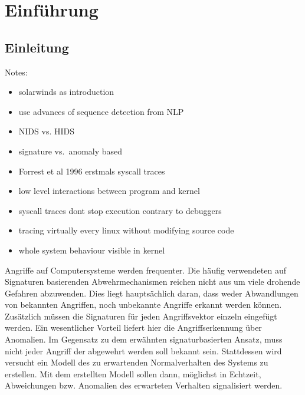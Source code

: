 \chapter{Einführung}\label{ch:introduction} %
\section{Einleitung}\label{sec:einleitung}
Notes:

\begin{itemize}
    \item solarwinds as introduction
    \item use advances of sequence detection from NLP
    \item NIDS vs. HIDS
    \item signature vs.\ anomaly based
    \item Forrest et al 1996 erstmals syscall traces
    \item low level interactions between program and kernel
    \item syscall traces dont stop execution contrary to debuggers
    \item tracing virtually every linux without modifying source code
    \item whole system behaviour visible in kernel
\end{itemize}

Angriffe auf Computersysteme werden frequenter.
Die häufig verwendeten auf Signaturen basierenden Abwehrmechanismen reichen nicht aus um viele drohende Gefahren abzuwenden.
Dies liegt hauptsächlich daran, dass weder Abwandlungen von bekannten Angriffen, noch unbekannte Angriffe erkannt werden können.
Zusätzlich müssen die Signaturen für jeden Angriffsvektor einzeln eingefügt werden.
Ein wesentlicher Vorteil liefert hier die Angriffserkennung über Anomalien.
Im Gegensatz zu dem erwähnten signaturbasierten Ansatz, muss nicht jeder Angriff der abgewehrt werden soll bekannt sein.
Stattdessen wird versucht ein Modell des zu erwartenden Normalverhalten des Systems zu erstellen.
Mit dem erstellten Modell sollen dann, möglichst in Echtzeit, Abweichungen bzw. Anomalien des erwarteten Verhalten signalisiert werden.

